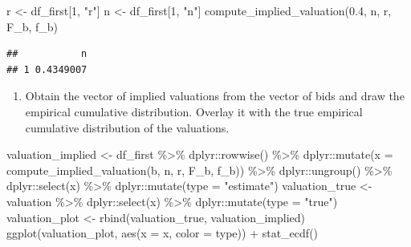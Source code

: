 \documentclass[
]{book}
\newenvironment{Shaded}{\begin{snugshade}}{\end{snugshade}}
\newcommand{\AttributeTok}[1]{\textcolor[rgb]{0.77,0.63,0.00}{#1}}
\newcommand{\DecValTok}[1]{\textcolor[rgb]{0.00,0.00,0.81}{#1}}
\newcommand{\FloatTok}[1]{\textcolor[rgb]{0.00,0.00,0.81}{#1}}
\newcommand{\FunctionTok}[1]{\textcolor[rgb]{0.00,0.00,0.00}{#1}}
\newcommand{\NormalTok}[1]{#1}
\newcommand{\OtherTok}[1]{\textcolor[rgb]{0.56,0.35,0.01}{#1}}
\newcommand{\SpecialCharTok}[1]{\textcolor[rgb]{0.00,0.00,0.00}{#1}}
\newcommand{\StringTok}[1]{\textcolor[rgb]{0.31,0.60,0.02}{#1}}
\providecommand{\tightlist}{%
  \setlength{\itemsep}{0pt}\setlength{\parskip}{0pt}}
\begin{document}
\begin{Shaded}
\begin{Highlighting}[]
\NormalTok{r }\OtherTok{\textless{}{-}}\NormalTok{ df\_first[}\DecValTok{1}\NormalTok{, }\StringTok{"r"}\NormalTok{]}
\NormalTok{n }\OtherTok{\textless{}{-}}\NormalTok{ df\_first[}\DecValTok{1}\NormalTok{, }\StringTok{"n"}\NormalTok{]}
\FunctionTok{compute\_implied\_valuation}\NormalTok{(}\FloatTok{0.4}\NormalTok{, n, r, F\_b, f\_b)}
\end{Highlighting}
\end{Shaded}

\begin{verbatim}
##           n
## 1 0.4349007
\end{verbatim}

\begin{enumerate}
\def\labelenumi{\arabic{enumi}.}
\setcounter{enumi}{12}
\tightlist
\item
  Obtain the vector of implied valuations from the vector of bids and draw the empirical cumulative distribution. Overlay it with the true empirical cumulative distribution of the valuations.
\end{enumerate}

\begin{Shaded}
\begin{Highlighting}[]
\NormalTok{valuation\_implied }\OtherTok{\textless{}{-}}\NormalTok{ df\_first }\SpecialCharTok{\%\textgreater{}\%}
\NormalTok{  dplyr}\SpecialCharTok{::}\FunctionTok{rowwise}\NormalTok{() }\SpecialCharTok{\%\textgreater{}\%}
\NormalTok{  dplyr}\SpecialCharTok{::}\FunctionTok{mutate}\NormalTok{(}\AttributeTok{x =} \FunctionTok{compute\_implied\_valuation}\NormalTok{(b, n, r, F\_b, f\_b)) }\SpecialCharTok{\%\textgreater{}\%}
\NormalTok{  dplyr}\SpecialCharTok{::}\FunctionTok{ungroup}\NormalTok{() }\SpecialCharTok{\%\textgreater{}\%}
\NormalTok{  dplyr}\SpecialCharTok{::}\FunctionTok{select}\NormalTok{(x) }\SpecialCharTok{\%\textgreater{}\%}
\NormalTok{  dplyr}\SpecialCharTok{::}\FunctionTok{mutate}\NormalTok{(}\AttributeTok{type =} \StringTok{"estimate"}\NormalTok{)}
\NormalTok{valuation\_true }\OtherTok{\textless{}{-}}\NormalTok{ valuation }\SpecialCharTok{\%\textgreater{}\%}
\NormalTok{  dplyr}\SpecialCharTok{::}\FunctionTok{select}\NormalTok{(x) }\SpecialCharTok{\%\textgreater{}\%}
\NormalTok{  dplyr}\SpecialCharTok{::}\FunctionTok{mutate}\NormalTok{(}\AttributeTok{type =} \StringTok{"true"}\NormalTok{)}
\NormalTok{valuation\_plot }\OtherTok{\textless{}{-}} \FunctionTok{rbind}\NormalTok{(valuation\_true, valuation\_implied)}
\FunctionTok{ggplot}\NormalTok{(valuation\_plot, }\FunctionTok{aes}\NormalTok{(}\AttributeTok{x =}\NormalTok{ x, }\AttributeTok{color =}\NormalTok{ type)) }\SpecialCharTok{+} \FunctionTok{stat\_ecdf}\NormalTok{()}
\end{Highlighting}
\end{Shaded}
\end{document}
